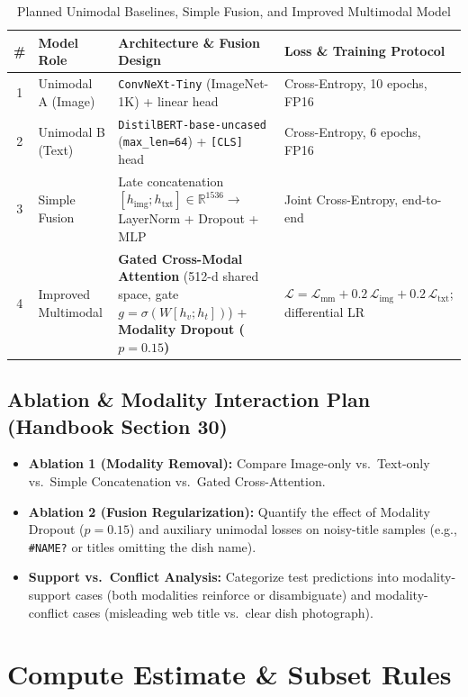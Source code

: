 \documentclass[twoside,final]{hcmut-report}
\begin{document}
\begin{table}[H]
\centering
\caption{Planned Unimodal Baselines, Simple Fusion, and Improved Multimodal Model}
\begin{tabularx}{\linewidth}{c l X X}
\toprule
\textbf{\#} & \textbf{Model Role} & \textbf{Architecture \& Fusion Design} & \textbf{Loss \& Training Protocol} \\
\midrule
1 & Unimodal A (Image) & \texttt{ConvNeXt-Tiny} (ImageNet-1K) + linear head & Cross-Entropy, 10 epochs, FP16 \\
2 & Unimodal B (Text) & \texttt{DistilBERT-base-uncased} (\texttt{max\_len=64}) + \texttt{[CLS]} head & Cross-Entropy, 6 epochs, FP16 \\
3 & Simple Fusion & Late concatenation $[h_{\text{img}}; h_{\text{txt}}] \in \mathbb{R}^{1536} \to$ LayerNorm + Dropout + MLP & Joint Cross-Entropy, end-to-end \\
4 & Improved Multimodal & \textbf{Gated Cross-Modal Attention} (512-d shared space, gate $g = \sigma(W[h_v; h_t])$) + \textbf{Modality Dropout ($p=0.15$)} & $\mathcal{L} = \mathcal{L}_{\text{mm}} + 0.2\,\mathcal{L}_{\text{img}} + 0.2\,\mathcal{L}_{\text{txt}}$; differential LR \\
\bottomrule
\end{tabularx}
\end{table}

\subsection{\textbf{Ablation \& Modality Interaction Plan (Handbook Section 30)}}
\begin{itemize}
    \item \textbf{Ablation 1 (Modality Removal):} Compare Image-only vs.\ Text-only vs.\ Simple Concatenation vs.\ Gated Cross-Attention.
    \item \textbf{Ablation 2 (Fusion Regularization):} Quantify the effect of Modality Dropout ($p=0.15$) and auxiliary unimodal losses on noisy-title samples (e.g., \texttt{\#NAME?} or titles omitting the dish name).
    \item \textbf{Support vs.\ Conflict Analysis:} Categorize test predictions into modality-support cases (both modalities reinforce or disambiguate) and modality-conflict cases (misleading web title vs.\ clear dish photograph).
\end{itemize}

\section{Compute Estimate \& Subset Rules}
\end{document}
